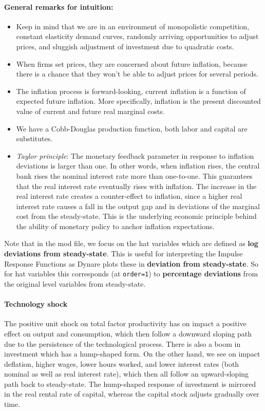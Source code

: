\begin{enumerate}
\paragraph{General remarks for intuition:}
\begin{itemize}
\item Keep in mind that we are in an environment of monopolistic competition,
  constant elasticity demand curves, randomly arriving opportunities to adjust prices,
  and sluggish adjustment of investment due to quadratic costs.
\item When firms set prices, they are concerned about future inflation,
  because there is a chance that they won't be able to adjust prices for several periods.			
\item The inflation process is forward-looking, current inflation is a function of expected future inflation.
More specifically, inflation is the present discounted value of current and future real marginal costs.
\item We have a Cobb-Douglas production function, both labor and capital are substitutes.
\item \emph{Taylor principle}: The monetary feedback parameter in response to inflation deviations is larger than one.
In other words, when inflation rises, the central bank rises the nominal interest rate more than one-to-one.
This guarantees that the real interest rate eventually rises with inflation.
The increase in the real interest rate creates a counter-effect to inflation,
  since a higher real interest rate causes a fall in the output gap and in deviations of the marginal cost from the steady-state.
This is the underlying economic principle behind the ability of monetary policy to anchor inflation expectations.
\end{itemize}
Note that in the mod file, we focus on the hat variables which are defined as \textbf{log deviations from steady-state}.
This is useful for interpreting the Impulse Response Functions as Dynare plots these in \textbf{deviation from steady-state}.
So for hat variables this corresponds (at \texttt{order=1}) to \textbf{percentage deviations} from the original level variables from steady-state.
  
\paragraph{Technology shock}
The positive unit shock on total factor productivity has on impact a positive effect on output and consumption,
  which then follow a downward sloping path due to the persistence of the technological process.
There is also a boom in investment which has a hump-shaped form.
On the other hand, we see on impact deflation, higher wages, lower hours worked,
  and lower interest rates (both nominal as well as real interest rate),
which then all follow an upward-sloping path back to steady-state.
The hump-shaped response of investment is mirrored in the real rental rate of capital,
  whereas the capital stock adjusts gradually over time.


\end{enumerate}

